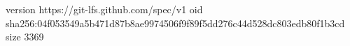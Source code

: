 version https://git-lfs.github.com/spec/v1
oid sha256:04f053549a5b471d87b8ae9974506f9f89f5dd276c44d528dc803edb80f1b3cd
size 3369
